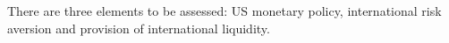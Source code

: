 \documentclass[12pt, a4paper, oneside]{article} %
\begin{document}
There are three elements to be assessed:  US monetary policy, international risk aversion and provision of international liquidity. 



\end{document}
